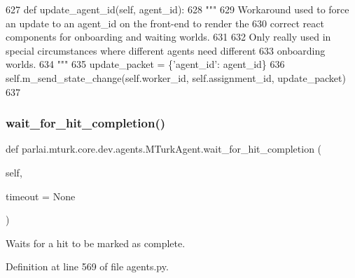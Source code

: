 \begin{DoxyCode}
627     \textcolor{keyword}{def }update\_agent\_id(self, agent\_id):
628         \textcolor{stringliteral}{"""}
629 \textcolor{stringliteral}{        Workaround used to force an update to an agent\_id on the front-end to render the}
630 \textcolor{stringliteral}{        correct react components for onboarding and waiting worlds.}
631 \textcolor{stringliteral}{}
632 \textcolor{stringliteral}{        Only really used in special circumstances where different agents need different}
633 \textcolor{stringliteral}{        onboarding worlds.}
634 \textcolor{stringliteral}{        """}
635         update\_packet = \{\textcolor{stringliteral}{'agent\_id'}: agent\_id\}
636         self.m\_send\_state\_change(self.worker\_id, self.assignment\_id, update\_packet)
637 \end{DoxyCode}
\mbox{\label{classparlai_1_1mturk_1_1core_1_1dev_1_1agents_1_1MTurkAgent_a0e59979d8423f514f4c29dd169c21fda}} 
\subsubsection{\texorpdfstring{wait\+\_\+for\+\_\+hit\+\_\+completion()}{wait\_for\_hit\_completion()}}
{\footnotesize\ttfamily def parlai.\+mturk.\+core.\+dev.\+agents.\+M\+Turk\+Agent.\+wait\+\_\+for\+\_\+hit\+\_\+completion (\begin{DoxyParamCaption}\item[{}]{self,  }\item[{}]{timeout = {\ttfamily None} }\end{DoxyParamCaption})}

\begin{DoxyVerb}Waits for a hit to be marked as complete.
\end{DoxyVerb}
 

Definition at line 569 of file agents.\+py.


